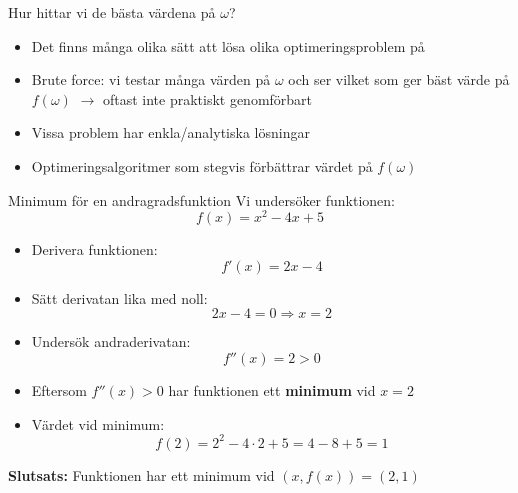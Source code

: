 \documentclass[10pt,english]{beamer}
\begin{document}
\begin{frame}{Hur hittar vi de bästa värdena på $\omega$?}
    \begin{itemize}
        \item Det finns många olika sätt att lösa olika optimeringsproblem på
        \item Brute force: vi testar många värden på $\omega$ och ser vilket som ger bäst värde på $f(\omega)$ $\rightarrow$ oftast inte praktiskt genomförbart
        \item Vissa problem har enkla/analytiska lösningar
        \item Optimeringsalgoritmer som stegvis förbättrar värdet på $f(\omega)$
    \end{itemize}
\end{frame}



\begin{frame}{Minimum för en andragradsfunktion}
    Vi undersöker funktionen:
    \[
    f(x) = x^2 - 4x + 5
    \]
    \begin{itemize}
        \item Derivera funktionen:
        \[
        f'(x) = 2x - 4
        \]
        \item Sätt derivatan lika med noll:
        \[
        2x - 4 = 0 \Rightarrow x = 2
        \]
        \item Undersök andraderivatan:
        \[
        f''(x) = 2 > 0
        \]
        \item Eftersom $f''(x) > 0$ har funktionen ett \textbf{minimum} vid $x = 2$
        \item Värdet vid minimum:
        \[
        f(2) = 2^2 - 4 \cdot 2 + 5 = 4 - 8 + 5 = 1
        \]
    \end{itemize}
    \textbf{Slutsats:} Funktionen har ett minimum vid $(x, f(x)) = (2, 1)$
\end{frame}
\end{document}

